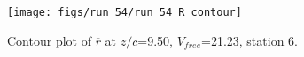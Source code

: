 \begin{figure}[H]
\centering
\texttt{[image: figs/run\_54/run\_54\_R\_contour]}
\caption{Contour plot of $\overline{r}$ at $z/c$=9.50, $V_{free}$=21.23, station 6.}
\label{fig:run_54_R_contour}
\end{figure}


